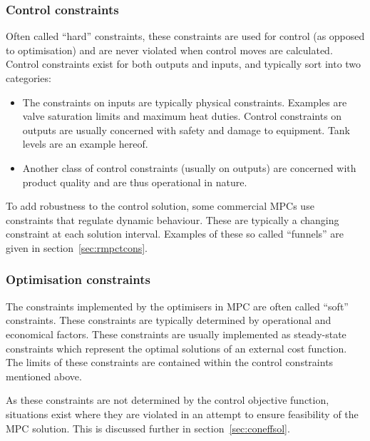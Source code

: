 \subsubsection{Control constraints}
Often called ``hard'' constraints, these constraints are used for control (as opposed to optimisation) and are never violated when control moves are calculated.
Control constraints exist for both outputs and inputs, and typically sort into two categories:
\begin{itemize}
  \item The constraints on inputs are typically physical constraints.
    Examples are valve saturation limits and maximum heat duties.
    Control constraints on outputs are usually concerned with safety and damage to equipment.
    Tank levels are an example hereof.
  \item Another class of control constraints (usually on outputs) are concerned with product quality and are thus operational in nature.
\end{itemize}
To add robustness to the control solution, some commercial MPCs use constraints that regulate dynamic behaviour.
These are typically a changing constraint at each solution interval.
Examples of these so called ``funnels'' are given in section~\ref{sec:rmpctcons}.

\subsubsection{Optimisation constraints}
The constraints implemented by the optimisers in MPC are often called ``soft'' constraints.
These constraints are typically determined by operational and economical factors.
These constraints are usually implemented as steady-state constraints which represent the optimal solutions of an external cost function.
The limits of these constraints are contained within the control constraints mentioned above.

As these constraints are not determined by the control objective function, situations exist where they are violated in an attempt to ensure feasibility of the MPC solution.
This is discussed further in section~\ref{sec:coneffsol}.
 
